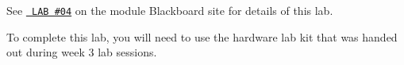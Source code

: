 See \href{https://tcd.blackboard.com/webapps/assignment/uploadAssignment?content_id=_2127030_1&course_id=_71874_1&group_id=&mode=cpview}{\texttt{ LAB \#04}} on the module Blackboard site for details of this lab.

To complete this lab, you will need to use the hardware lab kit that was handed out during week 3 lab sessions. 